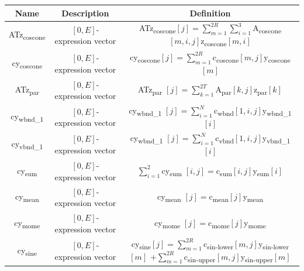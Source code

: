 \documentclass[12pt]{article}
\numberwithin{equation}{section}
\begin{document}
\renewcommand{\arraystretch}{1.5}

\begin{table}[h] \centering
\scriptsize
 \begin{tabular}{| c |c|c|} 
 
 
 \hline
          Name & Description & Definition  \\ 
 \hline
 \hline
    
    
    
        ATz\textsubscript{coscone} & $[0,E]$-expression vector & ATz\textsubscript{coscone}$[j] = \sum_{m=1}^{2R} \sum_{i=1}^3 $A\textsubscript{coscone}$[m,i,j]$z\textsubscript{coscone}$[m,i]$\\
      \hline
           cy\textsubscript{coscone} &$[0,E]$-expression vector &cy\textsubscript{coscone}$[j] = \sum_{m=1}^{2R}$c\textsubscript{coscone}$[m,j]$y\textsubscript{coscone}$[m]$ \\
      \hline
          ATz\textsubscript{par} &$[0,E]$-expression vector &ATz\textsubscript{par} $[j]= \sum_{k=1}^{2T}$A\textsubscript{par}$[k,j]$z\textsubscript{par}$[k]$ \\
      \hline
             cy\textsubscript{wbnd\_1} &$[0,E]$-expression vector & cy\textsubscript{wbnd\_1} $[j]=\sum_{i=1}^N$c\textsubscript{wbnd}$[1,i,j]$y\textsubscript{wbnd\_1}$[i]$ \\
      \hline
             cy\textsubscript{vbnd\_1} &$[0,E]$-expression vector & cy\textsubscript{wbnd\_1} $[j]=\sum_{i=1}^N$c\textsubscript{vbnd}$[1,i,j]$y\textsubscript{vbnd\_1}$[i]$ \\
      \hline
             cy\textsubscript{sum} &$[0,E]$-expression vector & $\sum_{i=1}^2$cy\textsubscript{sum} $[i,j]=$c\textsubscript{sum}$[i,j]$y\textsubscript{sum}$[i]$ \\
      \hline
             cy\textsubscript{mean} &$[0,E]$-expression vector & cy\textsubscript{mean} $[j]=$c\textsubscript{mean}$[j]$y\textsubscript{mean} \\
      \hline
             cy\textsubscript{mome} &$[0,E]$-expression vector & cy\textsubscript{mome} $[j]=$c\textsubscript{mome}$[j]$y\textsubscript{mome} \\
      \hline
               cy\textsubscript{sine} &$[0,E]$-expression vector &\makecell{ cy\textsubscript{sine}$[j] = \sum_{m=1}^{2R}$c\textsubscript{sin-lower}$[m,j]$y\textsubscript{sin-lower}$[m]$\\$+\sum_{m=1}^{2R}$c\textsubscript{sin-upper}$[m,j]$y\textsubscript{sin-upper}$[m]$}\\
      \hline

\end{tabular}
\end{table}
\end{document}
